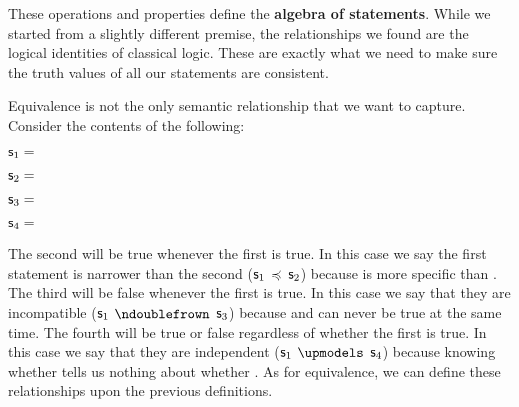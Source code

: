 \documentclass[11pt,letterpaper,fleqn]{memoir} %
\begin{document}
These operations and properties define the \textbf{algebra of statements}. While we started from a slightly different premise, the relationships we found are the logical identities of classical logic. These are exactly what we need to make sure the truth values of all our statements are consistent.

Equivalence is not the only semantic relationship that we want to capture. Consider the contents of the following:
\begin{description}
	\item $\mathsf{s}_1=$
	\item $\mathsf{s}_2=$
	\item $\mathsf{s}_3=$
	\item $\mathsf{s}_4=$
\end{description}
The second will be true whenever the first is true. In this case we say the first statement is narrower than the second ($\mathsf{s}_1$ $\preccurlyeq$ $\mathsf{s}_2$) because  is more specific than . The third will be false whenever the first is true. In this case we say that they are incompatible ($\mathsf{s}_1$ $\ncomp$ $\mathsf{s}_3$) because  and  can never be true at the same time. The fourth will be true or false regardless of whether the first is true. In this case we say that they are independent ($\mathsf{s}_1$ $\indep$ $\mathsf{s}_4$) because knowing whether  tells us nothing about whether . As for equivalence, we can define these relationships upon the previous definitions.
\end{document}
